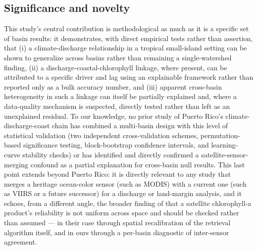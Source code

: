\documentclass[preprint,12pt]{elsarticle}
\begin{document}
\subsection{Significance and novelty}
This study's central contribution is methodological as much as it is a specific set of basin results: it demonstrates, with direct empirical tests rather than assertion, that (i) a climate-discharge relationship in a tropical small-island setting can be shown to generalize across basins rather than remaining a single-watershed finding, (ii) a discharge-coastal-chlorophyll linkage, where present, can be attributed to a specific driver and lag using an explainable framework rather than reported only as a bulk accuracy number, and (iii) apparent cross-basin heterogeneity in such a linkage can itself be partially explained and, where a data-quality mechanism is suspected, directly tested rather than left as an unexplained residual. To our knowledge, no prior study of Puerto Rico's climate-discharge-coast chain has combined a multi-basin design with this level of statistical validation (two independent cross-validation schemes, permutation-based significance testing, block-bootstrap confidence intervals, and learning-curve stability checks) or has identified and directly confirmed a satellite-sensor-merging confound as a partial explanation for cross-basin null results. This last point extends beyond Puerto Rico: it is directly relevant to any study that merges a heritage ocean-color sensor (such as MODIS) with a current one (such as VIIRS or a future successor) for a discharge or land-margin analysis, and it echoes, from a different angle, the broader finding of \citet{holbach2025chlorophyll} that a satellite chlorophyll-a product's reliability is not uniform across space and should be checked rather than assumed --- in their case through spatial recalibration of the retrieval algorithm itself, and in ours through a per-basin diagnostic of inter-sensor agreement.
\end{document}
